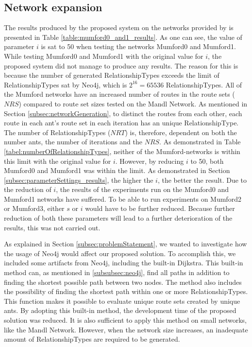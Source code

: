 \subsection{Network expansion}
\label{subsec:networkExpansion}

The results produced by the proposed system on the networks provided by \citet{mumford13} is presented in  Table \vref{table:mumford0_and1_results}. As one can see, the value of parameter $i$ is sat to 50 when testing the networks Mumford0 and Mumford1. While testing Mumford0 and Mumford1 with the original value for $i$, the proposed system did not manage to produce any results. The reason for this is because the number of generated RelationshipTypes exceeds the limit of RelationshipTypes sat by Neo4j, which is $2^{16} = 65 536$ RelationshipTypes. All of the Mumford networks have an increased number of routes in the route sets ($NRS$) compared to route set sizes tested on the Mandl Network. As mentioned in Section \vref{subsec:networkGeneration}, to distinct the routes from each other, each route in each ant's route set in each iteration has an unique RelationshipType. The number of RelationshipTypes ($NRT$) is, therefore, dependent on both the number ants, the number of iterations and the $NRS$. As demonstrated in Table \vref{tabel:numberOfRelationshipTypes}, neither of the Mumford-networks is within this limit with the original value for $i$. However, by reducing $i$ to 50, both Mumford0 and Mumford1 was within the limit. As demonstrated in Section \vref{subsec:parameterSettings_results}, the higher the $i$, the better the result. Due to the reduction of $i$, the results of the experiments run on the Mumford0 and Mumford1 networks have suffered. To be able to run experiments on Mumford2 or Mumford3, either $s$ or $i$ would have to be further reduced. Because further reduction of both these parameters will lead to a further deterioration of the results, this was not carried out.

As explained in Section \vref{subsec:problemStatement}, we wanted to investigate how the usage of Neo4j would affect our proposed solution. To accomplish this, we included some artifacts from Neo4j, including the built-in Dijkstra. This built-in method can, as mentioned in \vref{subsubsec:neo4j}, find all paths in addition to finding the shortest possible path between two nodes. The method also includes the possibility of finding the shortest path within one or more RelationshipTypes. This function makes it possible to evaluate unique route sets created by unique ants. By adopting this built-in method, the development time of the proposed solution was reduced. It is also sufficient to apply this method on small networks, like the Mandl Network. However, when the network size increases, an inadequate amount of RelationshipTypes are required to be generated.

